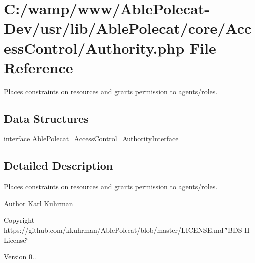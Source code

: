 \hypertarget{_authority_8php}{}\section{C\+:/wamp/www/\+Able\+Polecat-\/\+Dev/usr/lib/\+Able\+Polecat/core/\+Access\+Control/\+Authority.php File Reference}
\label{_authority_8php}


Places constraints on resources and grants permission to agents/roles.  


\subsection*{Data Structures}
\begin{DoxyCompactItemize}
\item 
interface \hyperlink{interface_able_polecat___access_control___authority_interface}{Able\+Polecat\+\_\+\+Access\+Control\+\_\+\+Authority\+Interface}
\end{DoxyCompactItemize}


\subsection{Detailed Description}
Places constraints on resources and grants permission to agents/roles. 

\begin{DoxyAuthor}{Author}
Karl Kuhrman 
\end{DoxyAuthor}
\begin{DoxyCopyright}{Copyright}
https\+://github.com/kkuhrman/\+Able\+Polecat/blob/master/\+L\+I\+C\+E\+N\+S\+E.\+md \char`\"{}\+B\+D\+S I\+I License\char`\"{} 
\end{DoxyCopyright}
\begin{DoxyVersion}{Version}
0.. 
\end{DoxyVersion}
